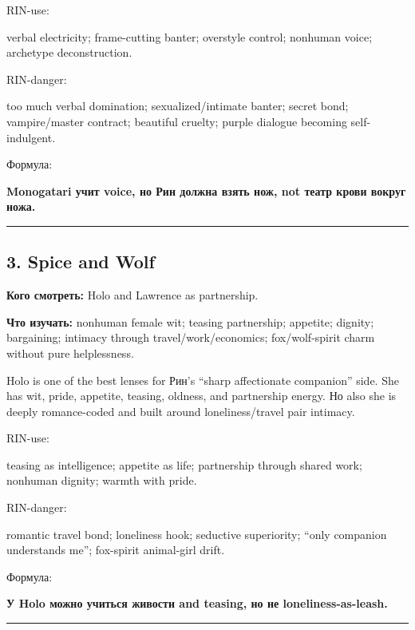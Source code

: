 RIN-use:

verbal electricity; frame-cutting banter; overstyle control; nonhuman
voice; archetype deconstruction.

RIN-danger:

too much verbal domination; sexualized/\hspace{0pt}intimate banter; secret bond;
vampire/\hspace{0pt}master contract; beautiful cruelty; purple dialogue becoming
self-indulgent.

Формула:

\textbf{Monogatari учит voice, но Рин должна взять нож, not театр крови
вокруг ножа.}

\begin{center}\rule{0.5\linewidth}{0.5pt}\end{center}

\subsection*{3. Spice and Wolf}

\textbf{Кого смотреть:} Holo and Lawrence as partnership.

\textbf{Что изучать:} nonhuman female wit; teasing partnership;
appetite; dignity; bargaining; intimacy through travel/\hspace{0pt}work/\hspace{0pt}economics;
fox/\hspace{0pt}wolf-spirit charm without pure helplessness.

Holo is one of the best lenses for Рин's ``sharp affectionate
companion'' side. She has wit, pride, appetite, teasing, oldness, and
partnership energy. Но also she is deeply romance-coded and built around
loneliness/\hspace{0pt}travel pair intimacy.

RIN-use:

teasing as intelligence; appetite as life; partnership through shared
work; nonhuman dignity; warmth with pride.

RIN-danger:

romantic travel bond; loneliness hook; seductive superiority; ``only
companion understands me''; fox-spirit animal-girl drift.

Формула:

\textbf{У Holo можно учиться живости and teasing, но не
loneliness-as-leash.}

\begin{center}\rule{0.5\linewidth}{0.5pt}\end{center}

